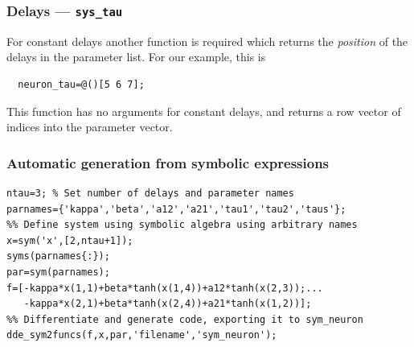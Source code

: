 \documentclass[10pt]{scrartcl}
\newcommand{\blist}[1]{\mbox{\lstinline!#1!}}
\begin{document}
\subsubsection{Delays --- \texorpdfstring{\blist{sys_tau}}{sys\_tau}} \label{sec:consttau}
For constant delays another function is required which returns the
\emph{position} of the delays in the parameter list. For our example,
this is
\begin{lstlisting}
  neuron_tau=@()[5 6 7];
\end{lstlisting}
This function has no arguments for constant delays, and returns a row
vector of indices into the parameter vector.


\subsubsection{Automatic generation from symbolic expressions}
\label{sec:symbconst}
\begin{lstlisting}[float,frame=lines,label=neuron_symbolic,caption={Definition for right-hand side and all derivatives of \eqref{example_sys} using the symbolic toolbox. See \Cref{neuron_sys_rhs} for manually provided right-hand sides. See \Cref{sec:funcs} for how to use the generated functions.}]
ntau=3; % Set number of delays and parameter names
parnames={'kappa','beta','a12','a21','tau1','tau2','taus'};
%% Define system using symbolic algebra using arbitrary names
x=sym('x',[2,ntau+1]);
syms(parnames{:});
par=sym(parnames);
f=[-kappa*x(1,1)+beta*tanh(x(1,4))+a12*tanh(x(2,3));...
   -kappa*x(2,1)+beta*tanh(x(2,4))+a21*tanh(x(1,2))];
%% Differentiate and generate code, exporting it to sym_neuron
dde_sym2funcs(f,x,par,'filename','sym_neuron');
\end{lstlisting}
\end{document}
